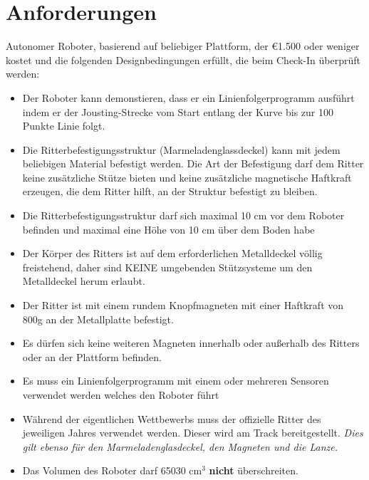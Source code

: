 \documentclass[a4paper,12pt]{article}
\begin{document}
\section{Anforderungen}
Autonomer Roboter, basierend auf beliebiger Plattform, der \euro{1.500}  oder
weniger kostet und die folgenden Designbedingungen erfüllt, die beim Check-In
überprüft werden:
\begin{itemize}
	\item Der Roboter kann demonstieren, dass er ein Linienfolgerprogramm
		ausführt indem er der Jousting-Strecke vom Start entlang der
		Kurve bis zur 100 Punkte Linie folgt.
	\item Die Ritterbefestigungsstruktur (Marmeladenglassdeckel) kann mit
		jedem beliebigen Material befestigt werden. Die Art der
		Befestigung darf dem Ritter keine zusätzliche Stütze bieten und
		keine zusätzliche magnetische Haftkraft erzeugen, die dem
		Ritter hilft, an der Struktur befestigt zu bleiben.
	\item Die Ritterbefestigungsstruktur darf sich maximal 10 cm vor dem
		Roboter befinden und maximal eine Höhe von 10 cm über dem Boden
		habe
	\item Der Körper des Ritters ist auf dem erforderlichen Metalldeckel
		völlig freistehend, daher sind KEINE umgebenden Stützsysteme um
		den Metalldeckel herum erlaubt.
	\item Der Ritter ist mit einem rundem Knopfmagneten mit einer Haftkraft
		von 800g an der Metallplatte befestigt.
	\item Es dürfen sich keine weiteren Magneten innerhalb oder außerhalb
		des Ritters oder an der Plattform befinden.
	\item Es muss ein Linienfolgerprogramm mit einem oder mehreren Sensoren
		verwendet werden welches den Roboter führt
	\item Während der eigentlichen Wettbewerbs muss der offizielle Ritter
		des jeweiligen Jahres verwendet werden. Dieser wird am Track
		bereitgestellt. \emph{Dies gilt ebenso für den Marmeladenglasdeckel,
		den Magneten und die Lanze.}
	\item Das Volumen des Roboter darf 65030 cm$^{3}$ \textbf{nicht}
		überschreiten.
\end{itemize}
\end{document}
